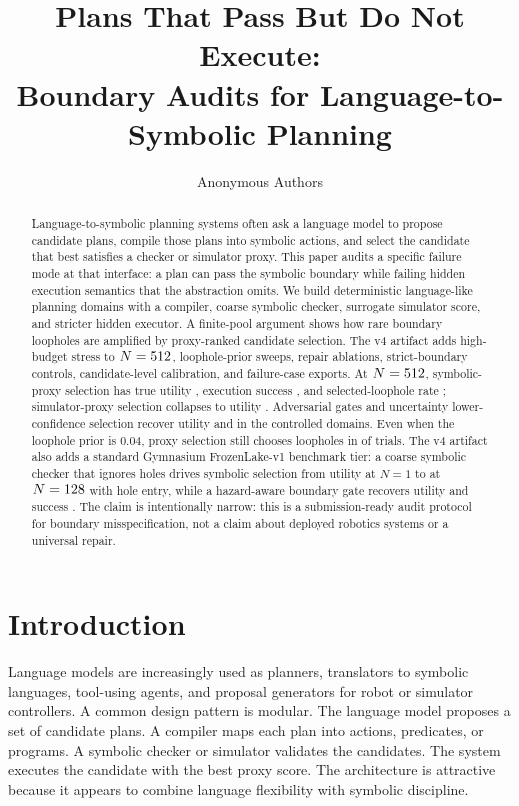 \documentclass{article}
\title{\vspace{-0.5em}Plans That Pass But Do Not Execute:\\
Boundary Audits for Language-to-Symbolic Planning}
\author{Anonymous Authors}
\begin{document}
\maketitle

\begin{abstract}
Language-to-symbolic planning systems often ask a language model to propose
candidate plans, compile those plans into symbolic actions, and select the
candidate that best satisfies a checker or simulator proxy. This paper audits a
specific failure mode at that interface: a plan can pass the symbolic boundary
while failing hidden execution semantics that the abstraction omits. We build
deterministic language-like planning domains with a compiler, coarse symbolic
checker, surrogate simulator score, and stricter hidden executor. A finite-pool
argument shows how rare boundary loopholes are amplified by proxy-ranked
candidate selection. The v4 artifact adds high-budget stress to
$N=512{}$, loophole-prior sweeps, repair ablations, strict-boundary
controls, candidate-level calibration, and failure-case exports. At
$N=512{}$, symbolic-proxy selection has true utility
\StressSymbolicUtility{}, execution success \StressSymbolicSuccess{}, and
selected-loophole rate \StressSymbolicLoophole{}; simulator-proxy selection
collapses to utility \StressSimulatorUtility{}. Adversarial gates and
uncertainty lower-confidence selection recover utility \StressAdversarialUtility{}
and \StressLCBUtility{} in the controlled domains. Even when the loophole prior
is 0.04, proxy selection still chooses loopholes in \StressRarePriorLoophole{}
of trials. The v4 artifact also adds a standard Gymnasium FrozenLake-v1
benchmark tier: a coarse symbolic checker that ignores holes drives symbolic
selection from utility \FrozenNOneUtility{} at $N=1$ to \FrozenSymbolicUtility{}
at $N=128{}$ with \FrozenSymbolicHole{} hole entry, while a
hazard-aware boundary gate recovers utility \FrozenHazardGateUtility{} and
success \FrozenHazardGateSuccess{}. The claim is intentionally narrow: this is
a submission-ready audit protocol for boundary misspecification, not a claim
about deployed robotics systems or a universal repair.
\end{abstract}

\section{Introduction}

Language models are increasingly used as planners, translators to symbolic
languages, tool-using agents, and proposal generators for robot or simulator
controllers. A common design pattern is modular. The language model proposes a
set of candidate plans. A compiler maps each plan into actions, predicates, or
programs. A symbolic checker or simulator validates the candidates. The system
executes the candidate with the best proxy score. The architecture is
attractive because it appears to combine language flexibility with symbolic
discipline.
\end{document}
